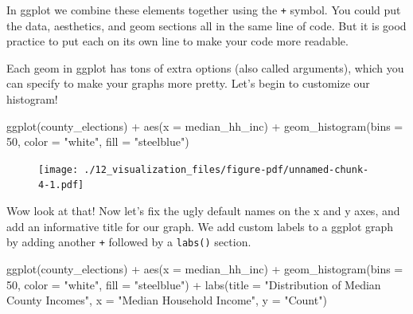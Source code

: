\documentclass[
  letterpaper,
]{book}
\newenvironment{Shaded}{\begin{snugshade}}{\end{snugshade}}
\newcommand{\AttributeTok}[1]{\textcolor[rgb]{0.40,0.45,0.13}{#1}}
\newcommand{\DecValTok}[1]{\textcolor[rgb]{0.68,0.00,0.00}{#1}}
\newcommand{\FunctionTok}[1]{\textcolor[rgb]{0.28,0.35,0.67}{#1}}
\newcommand{\NormalTok}[1]{\textcolor[rgb]{0.00,0.23,0.31}{#1}}
\newcommand{\SpecialCharTok}[1]{\textcolor[rgb]{0.37,0.37,0.37}{#1}}
\newcommand{\StringTok}[1]{\textcolor[rgb]{0.13,0.47,0.30}{#1}}
\theoremstyle{definition}
\theoremstyle{definition}
\theoremstyle{plain}
\theoremstyle{definition}
\theoremstyle{plain}
\theoremstyle{plain}
\theoremstyle{remark}
\begin{document}
In ggplot we combine these elements together using the \texttt{+}
symbol. You could put the data, aesthetics, and geom sections all in the
same line of code. But it is good practice to put each on its own line
to make your code more readable.

Each geom in ggplot has tons of extra options (also called arguments),
which you can specify to make your graphs more pretty. Let's begin to
customize our histogram!

\begin{Shaded}
\begin{Highlighting}[]
\FunctionTok{ggplot}\NormalTok{(county\_elections) }\SpecialCharTok{+}
  \FunctionTok{aes}\NormalTok{(}\AttributeTok{x =}\NormalTok{ median\_hh\_inc) }\SpecialCharTok{+}
  \FunctionTok{geom\_histogram}\NormalTok{(}\AttributeTok{bins =} \DecValTok{50}\NormalTok{,}
                 \AttributeTok{color =} \StringTok{"white"}\NormalTok{,}
                 \AttributeTok{fill =} \StringTok{"steelblue"}\NormalTok{)}
\end{Highlighting}
\end{Shaded}

\begin{figure}[H]

{\centering \texttt{[image: ./12\_visualization\_files/figure-pdf/unnamed-chunk-4-1.pdf]}

}

\end{figure}

Wow look at that! Now let's fix the ugly default names on the x and y
axes, and add an informative title for our graph. We add custom labels
to a ggplot graph by adding another \texttt{+} followed by a
\texttt{labs()} section.

\begin{Shaded}
\begin{Highlighting}[]
\FunctionTok{ggplot}\NormalTok{(county\_elections) }\SpecialCharTok{+}
  \FunctionTok{aes}\NormalTok{(}\AttributeTok{x =}\NormalTok{ median\_hh\_inc) }\SpecialCharTok{+}
  \FunctionTok{geom\_histogram}\NormalTok{(}\AttributeTok{bins =} \DecValTok{50}\NormalTok{,}
                 \AttributeTok{color =} \StringTok{"white"}\NormalTok{,}
                 \AttributeTok{fill =} \StringTok{"steelblue"}\NormalTok{) }\SpecialCharTok{+}
  \FunctionTok{labs}\NormalTok{(}\AttributeTok{title =} \StringTok{"Distribution of Median County Incomes"}\NormalTok{,}
       \AttributeTok{x =} \StringTok{"Median Household Income"}\NormalTok{,}
       \AttributeTok{y =} \StringTok{"Count"}\NormalTok{)}
\end{Highlighting}
\end{Shaded}
\end{document}
